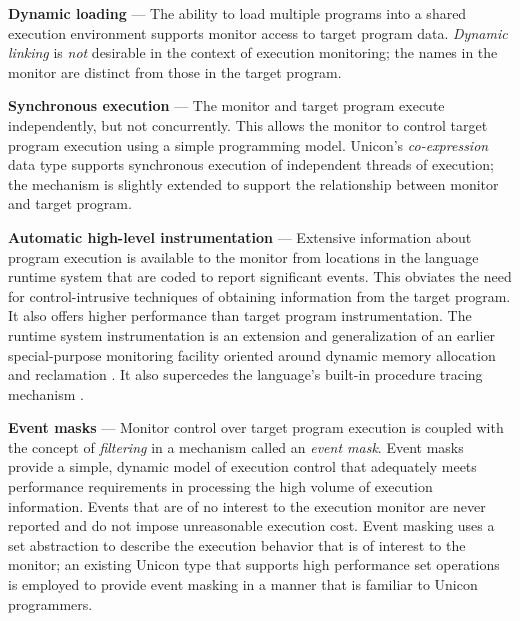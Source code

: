 \begin{list}{}{\itemsep 7pt}
\item [{\bf Dynamic loading}] --- The ability to load multiple programs
	into a shared execution environment supports
	monitor access to target program data.
	{\em Dynamic linking\/} is {\em not\/} desirable in the
	context of execution monitoring; the names in the
	monitor are distinct from those in the target program. 
\item [{\bf Synchronous execution}] --- The monitor and target program execute
	independently, but not concurrently.  This allows the monitor
	to control target program execution using a simple programming model.
	Unicon's {\em co-expression\/} data
	type supports synchronous execution of independent threads of
	execution; the mechanism is slightly extended to support the
	relationship between monitor and target program.
\item [{\bf Automatic high-level instrumentation}] --- Extensive information
	about program execution is available to the monitor from
	locations in the language runtime system that are coded to report
	significant events.  This obviates the need for control-intrusive
	techniques of obtaining information from the target program.
	It also offers higher performance than target program
	instrumentation.  The runtime system instrumentation is an
	extension and generalization of an earlier special-purpose
	monitoring facility oriented around dynamic memory allocation
	and reclamation \cite{Townsend89}.
	It also supercedes the language's built-in procedure
	tracing mechanism \cite{Griswold97}.
\item [{\bf Event masks}] --- Monitor control over target program
	execution is coupled with the concept of {\em filtering\/}
	\cite{Elshoff89} in a mechanism called an {\em event mask\/}.
	Event masks provide a simple, dynamic model of execution
	control that adequately meets performance requirements in
	processing the high volume of execution information.
	Events that are of no interest to the execution
	monitor are never reported and do not impose unreasonable
	execution cost.  Event masking uses a set abstraction to
	describe the execution behavior that is of interest to the monitor;
	an existing Unicon type that supports high performance set
	operations is employed to provide event masking in a manner
	that is familiar to Unicon programmers.
\end{list}


